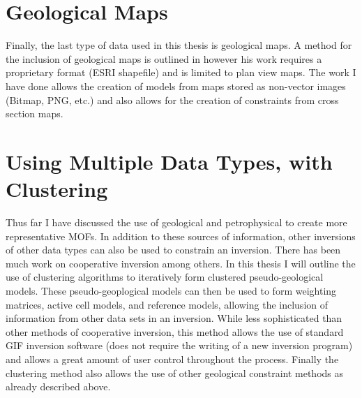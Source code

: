 \section{Geological Maps}
\label{sec: Geological Maps}

Finally, the last type of data used in this thesis is geological maps. A method for the inclusion of geological maps is outlined in \cite{williams2008geologically} however his work requires a proprietary format (ESRI shapefile) and is limited to plan view maps. The work I have done allows the creation of models from maps stored as non-vector images (Bitmap, PNG, etc.) and also allows for the creation of constraints from cross section maps.


\section{Using Multiple Data Types, with Clustering}
\label{sec:Using Multiple Data Types, with Clustering}

Thus far I have discussed the use of geological and petrophysical to create more representative \ac{MOF}s. In addition to these sources of information, other inversions of other data types can also be used to constrain an inversion. There has been much work on cooperative inversion \cite{sun2012joint} among others. In this thesis I will outline the use of clustering algorithms to iteratively form clustered pseudo-geological models. These pseudo-geoplogical models can then be used to form weighting matrices, active cell models, and reference models, allowing the inclusion of information from other data sets in an inversion. While less sophisticated than other methods of cooperative inversion, this method allows the use of standard GIF inversion software (does not require the writing of a new inversion program) and allows a great amount of user control throughout the process. Finally the clustering method also allows the use of other geological constraint methods as already described above.


\endinput

 Interestingly, the assumption that all magnetizations are in the same direction also assumes that all Koenigsberger ratios are equal.

Any text after an \endinput is ignored.
You could put scraps here or things in progress.
